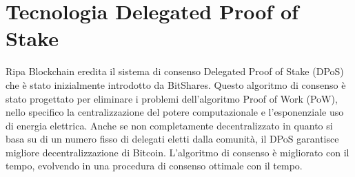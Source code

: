 \documentclass[11pt,fleqn]{book} %
\begin{document}
\section{Tecnologia Delegated Proof of Stake}
Ripa Blockchain eredita il sistema di consenso Delegated Proof of Stake (DPoS) che è stato inizialmente
introdotto da BitShares. Questo algoritmo di consenso è stato progettato per eliminare i problemi dell'algoritmo
Proof of Work (PoW), nello specifico la centralizzazione del potere computazionale e l'esponenziale uso di energia
elettrica. Anche se non completamente decentralizzato in quanto si basa su di un numero fisso di delegati eletti
dalla comunità, il DPoS garantisce migliore decentralizzazione di Bitcoin. L'algoritmo di consenso è migliorato
con il tempo, evolvendo in una procedura di consenso ottimale con il tempo.\\
\end{document}
